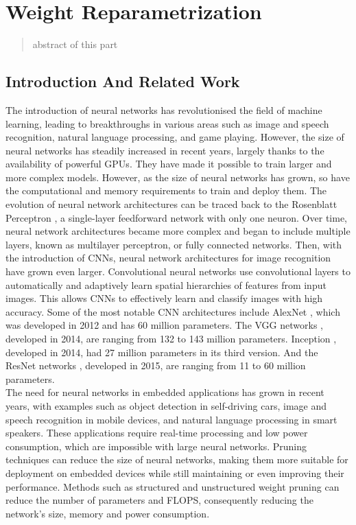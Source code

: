 \chapter{Weight Reparametrization}

\begin{abstract}
    abstract of this part
\end{abstract}

\section{Introduction And Related Work}
The introduction of neural networks has revolutionised the field of machine
learning, leading to breakthroughs in various areas such as image and speech
recognition, natural language processing, and game playing. However, the size of
neural networks has steadily increased in recent years, largely thanks to the
availability of powerful \ac{GPUs}. They have made it possible to train larger
and more complex models. However, as the size of neural networks has grown, so
have the computational and memory requirements to train and deploy them. The
evolution of neural network architectures can be traced back to the Rosenblatt
Perceptron \cite{rosenblatt1958perceptron}, a single-layer feedforward network
with only one neuron. Over time, neural network architectures became more
complex and began to include multiple layers, known as multilayer perceptron, or
fully connected networks. Then, with the introduction of \ac{CNNs}, neural
network architectures for image recognition have grown even larger.
Convolutional neural networks use convolutional layers to automatically and
adaptively learn spatial hierarchies of features from input images. This allows
\ac{CNNs} to effectively learn and classify images with high accuracy. Some of
the most notable \ac{CNN} architectures include AlexNet
\cite{DBLP:conf/nips/KrizhevskySH12}, which was developed in 2012 and has 60
million parameters. The VGG networks \cite{DBLP:journals/corr/SimonyanZ14a},
developed in 2014, are ranging from 132 to 143 million parameters. Inception
\cite{DBLP:conf/cvpr/SzegedyLJSRAEVR15}, developed in 2014, had 27 million
parameters in its third version. And the ResNet networks
\cite{DBLP:conf/cvpr/HeZRS16}, developed in 2015, are ranging from 11 to 60
million parameters. \\


The need for neural networks in embedded applications has grown in recent years,
with examples such as object detection in self-driving cars, image and speech
recognition in mobile devices, and natural language processing in smart
speakers. These applications require real-time processing and low power
consumption, which are impossible with large neural networks. Pruning techniques
can reduce the size of neural networks, making them more suitable for deployment
on embedded devices while still maintaining or even improving their performance.
Methods such as structured and unstructured weight pruning can reduce the number
of parameters and FLOPS, consequently reducing the network's size, memory and
power consumption.\\


